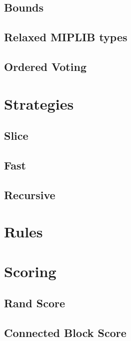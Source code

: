 		\subsection{Bounds}
		
			
		
		\subsection{Relaxed MIPLIB types}
			
		\subsection{Ordered Voting}
		\label{chap:tree:classifiers:voting}
		
%	
%			
		
	\section{Strategies}
	
		
	
		\subsection{Slice}
		
		\subsection{Fast}
		
		\subsection{Recursive}
		
	\section{Rules}
	
		
	
	\section{Scoring}

		\subsection{Rand Score}

		\subsection{Connected Block Score}
